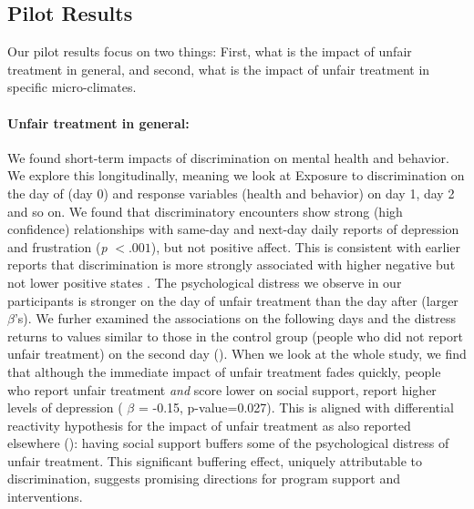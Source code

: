 \subsection{Pilot Results}
\label{sec:result}

\noindent Our pilot results focus on two things: First, what is the impact of unfair treatment in general, and second, what is the impact of unfair treatment in specific micro-climates.


\paragraph{Unfair treatment in general:} We found short-term impacts of discrimination on mental health and behavior. We explore this longitudinally, meaning we look at Exposure to discrimination on the day of (day 0) and response variables (health and behavior) on day 1, day 2 and so on.  We found that discriminatory encounters show strong (high confidence) relationships with same-day and next-day daily reports of depression and frustration (\textit{p} $<.001$), but not positive affect.  This is consistent with earlier reports that discrimination is more strongly associated with higher negative but not lower positive states \cite{Schmitt:2014}. 
The psychological distress we observe in our participants is stronger on the day of unfair treatment than the day after (larger $\beta$'s). We furher examined the associations on the following days and the distress returns to values similar to those in the control group (people who did not report unfair treatment) on the second day (). When we look at the whole study, we  find that although the immediate impact of unfair treatment fades quickly, people who report unfair treatment \textit{and} score lower on social support, report higher levels of depression (%
$\beta$ = -0.15, p-value=0.027). This is aligned with differential reactivity hypothesis for the impact of unfair treatment as also reported elsewhere (\eg \cite{Mossakowski:2014}): having social support buffers some of the psychological distress of unfair treatment. This significant buffering effect, uniquely attributable to discrimination, suggests promising directions for program support and interventions. 

